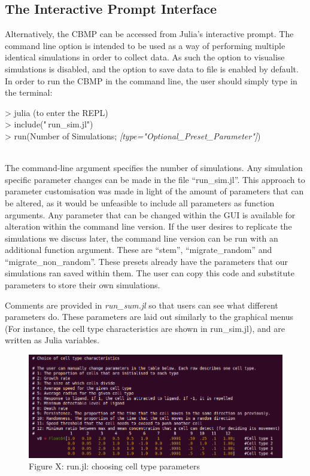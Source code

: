 \documentclass[12pt]{article}
\begin{document}
\subsection{The Interactive Prompt Interface}
Alternatively, the CBMP can be accessed from Julia's interactive prompt. 
The command line option is intended to be used as a way of performing 
multiple identical simulations in order to collect data. As such the 
option to visualise simulations is disabled, and the option to save data 
to file is enabled by default. In order to run the CBMP in the command 
line, the user should simply type in the terminal: \\

{\fontsize{11pt}{11pt} \ttfamily 

> julia (to enter the REPL) \\

> include("\,run\_sim.jl") \\

> run(Number of Simulations; {\itshape[type="Optional\_Preset\_Parameter"]})}\\

The command-line argument specifies the number of simulations. Any 
simulation specific parameter changes can be made in the file 
``run\_sim.jl''. This approach to parameter customisation was made in 
light of the amount of parameters that can be altered, as it would be 
unfeasible to include all parameters as function arguments. Any 
parameter that can be changed within the GUI is available for alteration 
within the command line version. If the user desires to replicate the 
simulations we discuss later, the command line version can be run with 
an additional function argument. These are ``stem'', ``migrate\_random'' 
and ``migrate\_non\_random''. These presets already have the parameters 
that our simulations ran saved within them. The user can copy this code 
and substitute parameters to store their own simulations.

Comments are provided in {\itshape run\_sum.jl} so that users can see 
what different parameters do. These parameters are laid out similarly to 
the graphical menus (For instance, the cell type characteristics are 
shown in run\_sim.jl), and are written as Julia variables.

\begin{figure}[H]
\centering
\includegraphics[width=\textwidth]{media/runsim.png}
\caption[]{Figure X: run.jl: choosing cell type parameters}
\end{figure}
\end{document}
